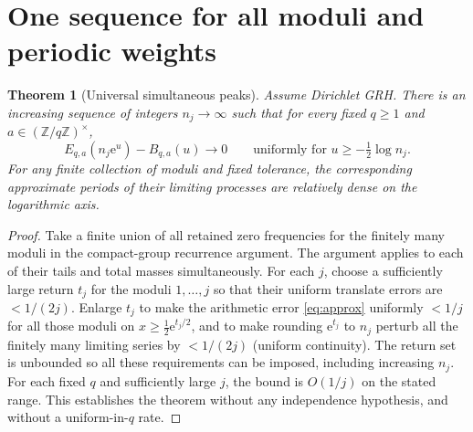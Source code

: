 \documentclass[11pt]{article}
\newtheorem{theorem}{Theorem}[section]
\theoremstyle{remark}\newtheorem{remark}[theorem]{Remark}
\newcommand{\e}{\mathrm{e}}
\begin{document}
\section{One sequence for all moduli and periodic weights}
\begin{theorem}[Universal simultaneous peaks]\label{thm:univ}
Assume Dirichlet GRH. There is an increasing sequence of integers $n_j\to\infty$ such that for every fixed $q\ge1$ and $a\in(\mathbb Z/q\mathbb Z)^\times$,
\[
 E_{q,a}(n_j\e^u)-B_{q,a}(u)\longrightarrow0
 \qquad\text{uniformly for }u\ge-\tfrac12\log n_j.
\]
For any finite collection of moduli and fixed tolerance, the corresponding approximate periods of their limiting processes are relatively dense on the logarithmic axis.
\end{theorem}
\begin{proof}
Take a finite union of all retained zero frequencies for the finitely many moduli in the compact-group recurrence argument. The argument applies to each of their tails and total masses simultaneously. For each $j$, choose a sufficiently large return $t_j$ for the moduli $1,\ldots,j$ so that their uniform translate errors are $<1/(2j)$. Enlarge $t_j$ to make the arithmetic error \eqref{eq:approx} uniformly $<1/j$ for all those moduli on $x\ge\tfrac12\e^{t_j/2}$, and to make rounding $\e^{t_j}$ to $n_j$ perturb all the finitely many limiting series by $<1/(2j)$ (uniform continuity). The return set is unbounded so all these requirements can be imposed, including increasing $n_j$. For each fixed $q$ and sufficiently large $j$, the bound is $O(1/j)$ on the stated range. This establishes the theorem without any independence hypothesis, and without a uniform-in-$q$ rate.
\end{proof}
\end{document}
